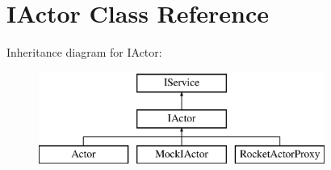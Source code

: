 \hypertarget{classIActor}{}\section{I\+Actor Class Reference}
\label{classIActor}
Inheritance diagram for I\+Actor\+:\begin{figure}[H]
\begin{center}
\leavevmode
\includegraphics[height=3.000000cm]{classIActor}
\end{center}
\end{figure}
